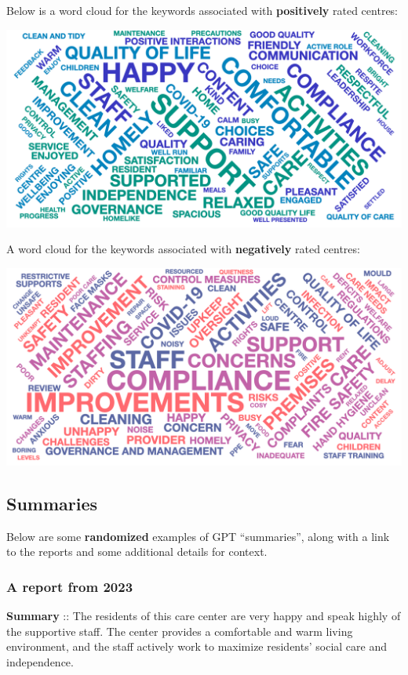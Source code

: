 \documentclass[a4paper,11pt,twoside]{article}
\begin{document}
Below is a word cloud for the keywords associated with \textbf{positively} rated centres:

\begin{center}
\includegraphics[width=.9\linewidth]{img/19_word_cloud_pos.png}
\end{center}

A word cloud for the keywords associated with \textbf{negatively} rated centres:

\begin{center}
\includegraphics[width=.9\linewidth]{img/20_word_cloud_neg.png}
\end{center}
\subsection{Summaries}
\label{sec:orgd99ca34}

Below are some \textbf{randomized} examples of GPT ``summaries'', along with a link to the reports and some additional details for context.
\subsubsection{A report from 2023}
\label{sec:orgc3fe639}

\textbf{Summary} :: The residents of this care center are very happy and speak highly of the supportive staff. The center provides a comfortable and warm living environment, and the staff actively work to maximize residents' social care and independence.
\end{document}
